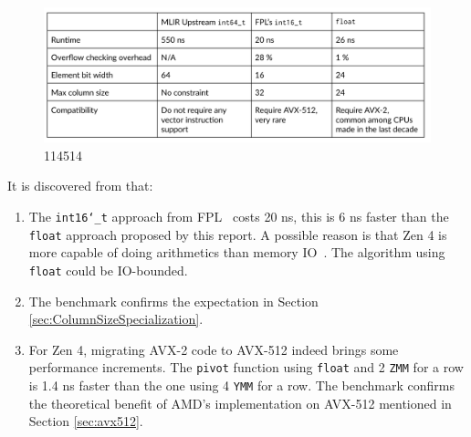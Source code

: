 \documentclass[logo,bsc,singlespacing,parskip]{infthesis}
\newcommand{\dtshort}{\texttt{int16\char`_t}}
\newcommand{\dtfloat}{\texttt{float}}
\newcommand{\pivot}{\texttt{pivot}}
\newcommand{\ymm}{\texttt{YMM}}
\newcommand{\zmm}{\texttt{ZMM}}
\begin{document}
\begin{figure}[H]
    \begin{center}
        \includegraphics[width=\linewidth]{image/i16-3ymmf32-upstream-table.png}
    \end{center}
    \caption{ 114514
    }
    \label{fig:i16-3ymmf32-upstream-table}
\end{figure}

It is discovered from that:
\begin{enumerate}
    \item The \dtshort{} approach from FPL~\cite{FPL2} costs 20 ns, this is 6 ns
    faster than the \dtfloat{} approach proposed by this report. A possible
    reason is that Zen 4 is more capable of doing arithmetics than memory
    IO~\cite{Zen4Critique}. The algorithm using \dtfloat{} could be IO-bounded. 
    \item The benchmark confirms the expectation in Section
    \ref{sec:ColumnSizeSpecialization}.
    \item For Zen 4, migrating AVX-2 code to AVX-512 indeed
    brings some performance increments. The \pivot{} function using \dtfloat{}
    and 2 \zmm{} for a row is 1.4 ns faster than the one using 4 \ymm{} for a
    row. The benchmark confirms the theoretical benefit of AMD's implementation
    on AVX-512 mentioned in Section \ref{sec:avx512}.

\end{enumerate}

\end{document}
